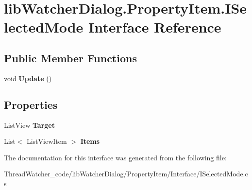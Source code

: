 \hypertarget{interfacelib_watcher_dialog_1_1_property_item_1_1_i_selected_mode}{\section{lib\+Watcher\+Dialog.\+Property\+Item.\+I\+Selected\+Mode Interface Reference}
\label{interfacelib_watcher_dialog_1_1_property_item_1_1_i_selected_mode}
}
\subsection*{Public Member Functions}
\begin{DoxyCompactItemize}
\item 
\hypertarget{interfacelib_watcher_dialog_1_1_property_item_1_1_i_selected_mode_a844342c8bf4fa7a81da5dd72df2be99d}{void {\bfseries Update} ()}\label{interfacelib_watcher_dialog_1_1_property_item_1_1_i_selected_mode_a844342c8bf4fa7a81da5dd72df2be99d}

\end{DoxyCompactItemize}
\subsection*{Properties}
\begin{DoxyCompactItemize}
\item 
\hypertarget{interfacelib_watcher_dialog_1_1_property_item_1_1_i_selected_mode_a848e83830ba681214e55b7c8dc6ef93c}{List\+View {\bfseries Target}}\label{interfacelib_watcher_dialog_1_1_property_item_1_1_i_selected_mode_a848e83830ba681214e55b7c8dc6ef93c}

\item 
\hypertarget{interfacelib_watcher_dialog_1_1_property_item_1_1_i_selected_mode_a0f859c05f9183f6cf7f88f68b5fdcb04}{List$<$ List\+View\+Item $>$ {\bfseries Items}}\label{interfacelib_watcher_dialog_1_1_property_item_1_1_i_selected_mode_a0f859c05f9183f6cf7f88f68b5fdcb04}

\end{DoxyCompactItemize}


The documentation for this interface was generated from the following file\+:\begin{DoxyCompactItemize}
\item 
Thread\+Watcher\+\_\+code/lib\+Watcher\+Dialog/\+Property\+Item/\+Interface/I\+Selected\+Mode.\+cs\end{DoxyCompactItemize}
